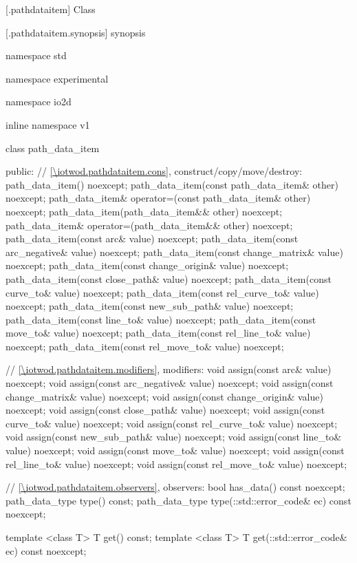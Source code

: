  [\iotwod.pathdataitem] {Class }

 [\iotwod.pathdataitem.synopsis] { synopsis}

\begin{codeblock}
namespace std { namespace experimental { namespace io2d { inline namespace v1 {
  class path_data_item {
  public:
    // \ref{\iotwod.pathdataitem.cons}, construct/copy/move/destroy:
    path_data_item() noexcept;
    path_data_item(const path_data_item& other) noexcept;
    path_data_item& operator=(const path_data_item& other) noexcept;
    path_data_item(path_data_item&& other) noexcept;
    path_data_item& operator=(path_data_item&& other) noexcept;
    path_data_item(const arc& value) noexcept;
    path_data_item(const arc_negative& value) noexcept;
    path_data_item(const change_matrix& value) noexcept;
    path_data_item(const change_origin& value) noexcept;
    path_data_item(const close_path& value) noexcept;
    path_data_item(const curve_to& value) noexcept;
    path_data_item(const rel_curve_to& value) noexcept;
    path_data_item(const new_sub_path& value) noexcept;
    path_data_item(const line_to& value) noexcept;
    path_data_item(const move_to& value) noexcept;
    path_data_item(const rel_line_to& value) noexcept;
    path_data_item(const rel_move_to& value) noexcept;

    // \ref{\iotwod.pathdataitem.modifiers}, modifiers:
    void assign(const arc& value) noexcept;
    void assign(const arc_negative& value) noexcept;
    void assign(const change_matrix& value) noexcept;
    void assign(const change_origin& value) noexcept;
    void assign(const close_path& value) noexcept;
    void assign(const curve_to& value) noexcept;
    void assign(const rel_curve_to& value) noexcept;
    void assign(const new_sub_path& value) noexcept;
    void assign(const line_to& value) noexcept;
    void assign(const move_to& value) noexcept;
    void assign(const rel_line_to& value) noexcept;
    void assign(const rel_move_to& value) noexcept;

    // \ref{\iotwod.pathdataitem.observers}, observers:
    bool has_data() const noexcept;
    path_data_type type() const;
    path_data_type type(::std::error_code& ec) const noexcept;

    template <class T>
    T get() const;
    template <class T>
    T get(::std::error_code& ec) const noexcept;

}}}}}
\end{codeblock}

